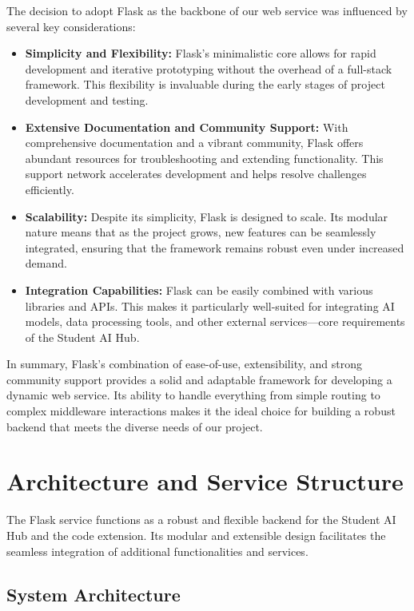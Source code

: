 The decision to adopt Flask as the backbone of our web service was influenced by several key considerations:
\begin{itemize}
    \item \textbf{Simplicity and Flexibility:} Flask's minimalistic core allows for rapid development and iterative prototyping without the overhead of a full-stack framework. This flexibility is invaluable during the early stages of project development and testing.
    \item \textbf{Extensive Documentation and Community Support:} With comprehensive documentation and a vibrant community, Flask offers abundant resources for troubleshooting and extending functionality. This support network accelerates development and helps resolve challenges efficiently.
    \item \textbf{Scalability:} Despite its simplicity, Flask is designed to scale. Its modular nature means that as the project grows, new features can be seamlessly integrated, ensuring that the framework remains robust even under increased demand.
    \item \textbf{Integration Capabilities:} Flask can be easily combined with various libraries and APIs. This makes it particularly well-suited for integrating AI models, data processing tools, and other external services—core requirements of the Student AI Hub.
\end{itemize}

In summary, Flask's combination of ease-of-use, extensibility, and strong community support provides a solid and adaptable framework for developing a dynamic web service. Its ability to handle everything from simple routing to complex middleware interactions makes it the ideal choice for building a robust backend that meets the diverse needs of our project.

\section{Architecture and Service Structure}

The Flask service functions as a robust and flexible backend for the Student AI Hub and the code extension. Its modular and extensible design facilitates the seamless integration of additional functionalities and services. 

\subsection{System Architecture}

